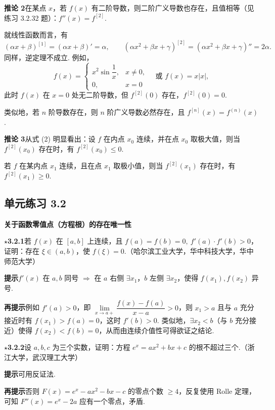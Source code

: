 \documentclass[UTF8,12pt,a4paper,fontset=fandol]{ctexart}
\begin{document}
\noindent\textbf{推论 2}\quad 在某点 $x$，若 $f(x)$ 有二阶导数，则二阶广义导数也存在，且值相等（见练习 3.2.32 题）：$f''(x)=f^{[2]}$.

就线性函数而言，有
\[
  (\alpha x+\beta)^{[1]}=(\alpha x+\beta)'=\alpha,
  \qquad
  (\alpha x^2+\beta x+\gamma)^{[2]}=(\alpha x^2+\beta x+\gamma)''=2\alpha.
\]
同样，逆定理不成立. 例如，
\[
  f(x)=
  \begin{cases}
    x^2\sin\dfrac1x,& x\ne0,\\
    0,& x=0
  \end{cases}
  \quad\text{或 }f(x)=x|x|,
\]
此时 $f(x)$ 在 $x=0$ 处无二阶导数，但 $f^{[2]}(0)$ 存在，$f^{[2]}(0)=0$.

类似地，若 $n$ 阶导数存在，则 $n$ 阶广义导数必然存在，且 $f^{[n]}(x)=f^{(n)}(x)$.

\noindent\textbf{推论 3}\quad 从式 (2) 明显看出：设 $f$ 在内点 $x_0$ 连续，并在点 $x_0$ 取极大值，则当 $f^{[2]}(x_0)$ 存在时，有 $f^{[2]}(x_0)\le0$.

若 $f$ 在某内点 $x_1$ 连续，且在点 $x_1$ 取极小值，则当 $f^{[2]}(x_1)$ 存在时，有 $f^{[2]}(x_1)\ge0$.

\subsection*{单元练习 3.2}

\noindent\textbf{关于函数零值点（方程根）的存在唯一性}

\noindent\textbf{$\star$3.2.1}\quad 若 $f(x)$ 在 $[a,b]$ 上连续，且 $f(a)=f(b)=0,\ f'(a)\cdot f'(b)>0$，证明：存在 $\xi\in(a,b)$，使 $f(\xi)=0$.（哈尔滨工业大学，华中科技大学，华中师范大学）

\noindent\textbf{提示}\quad $f'(x)$ 在 $a,b$ 同号 $\Rightarrow$ 在 $a$ 右侧 $\exists x_1$，$b$ 左侧 $\exists x_2$，使得 $f(x_1),f(x_2)$ 异号.

\noindent\textbf{再提示}\quad 例如 $f'(a)>0$，即 $\lim\limits_{x\to a+}\dfrac{f(x)-f(a)}{x-a}>0$，则 $x_1>a$ 且与 $a$ 充分接近时有 $f(x_1)>f(a)=0$，这时 $f'(b)>0$. 类似地，$\exists x_2<b$（与 $b$ 充分接近）使得 $f(x_2)<f(b)=0$，从而由连续介值性可得欲证之结论.

\noindent\textbf{$\star$3.2.2}\quad 设 $a,b,c$ 为三个实数，证明：方程 $e^x=ax^2+bx+c$ 的根不超过三个.（浙江大学，武汉理工大学）

\noindent\textbf{提示}\quad 可用反证法.

\noindent\textbf{再提示}\quad 否则 $F(x)=e^x-ax^2-bx-c$ 的零点个数 $\ge4$，反复使用 Rolle 定理，可知 $F''(x)=e^x-2a$ 应有一个零点，矛盾.
\end{document}

